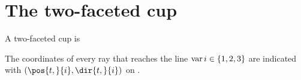 \section{The two-faceted cup}
A two-faceted cup is

The coordinates of every ray that reaches the line $\operatorname{var}{i}\in\{1, 2, 3\}$ are indicated  with $(\pos{t,}{i}, \dir{t,}{i})$ on .
